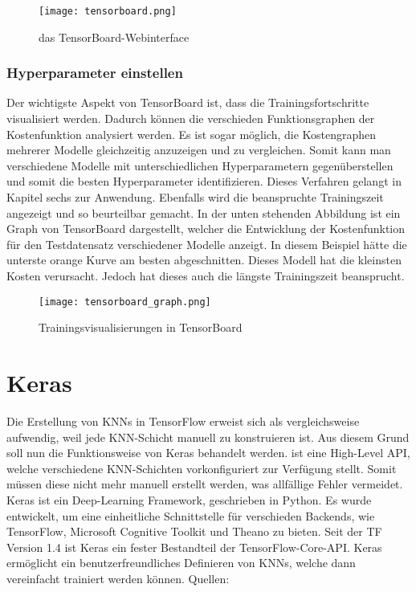 \begin{figure}[h!]
  \centering
  \texttt{[image: tensorboard.png]}
  \caption{das TensorBoard-Webinterface}
\end{figure}

\subsubsection{Hyperparameter einstellen}
Der wichtigste Aspekt von TensorBoard ist, dass die Trainingsfortschritte
visualisiert werden.
Dadurch können die verschieden Funktionsgraphen der Kostenfunktion analysiert werden.
Es ist sogar möglich, die Kostengraphen mehrerer Modelle gleichzeitig anzuzeigen und zu vergleichen.
Somit kann man verschiedene Modelle mit unterschiedlichen Hyperparametern
gegenüberstellen und somit die besten Hyperparameter identifizieren.
Dieses Verfahren gelangt in Kapitel sechs zur Anwendung.
Ebenfalls wird die beanspruchte Trainingszeit angezeigt und so beurteilbar gemacht.
\para{}
In der unten stehenden Abbildung ist ein Graph von TensorBoard dargestellt,
welcher die Entwicklung der Kostenfunktion für den Testdatensatz verschiedener
Modelle anzeigt. In diesem Beispiel hätte die unterste orange Kurve am besten
abgeschnitten. Dieses Modell hat die kleinsten Kosten verursacht. Jedoch hat
dieses auch die längste Trainingszeit beansprucht.

\begin{figure}[h!]
  \centering
  \texttt{[image: tensorboard\_graph.png]}
  \caption{Trainingsvisualisierungen in TensorBoard}
\end{figure}
\para{}

\section{Keras}
Die Erstellung von KNNs in TensorFlow erweist sich als vergleichsweise aufwendig, weil jede
KNN-Schicht manuell zu konstruieren ist.  Aus diesem Grund soll nun die
Funktionsweise von Keras behandelt werden.  ist eine High-Level
API, welche verschiedene KNN-Schichten vorkonfiguriert zur Verfügung stellt. Somit müssen diese
nicht mehr manuell erstellt werden, was allfällige Fehler vermeidet.
\para{}
Keras ist ein Deep-Learning Framework, geschrieben in
Python. Es wurde entwickelt, um eine einheitliche Schnittstelle für
verschieden Backends, wie TensorFlow, Microsoft Cognitive Toolkit und Theano zu
bieten. Seit der TF Version 1.4 ist Keras ein fester Bestandteil der TensorFlow-Core-API.
Keras ermöglicht ein benutzerfreundliches Definieren von
KNNs, welche dann vereinfacht trainiert werden können.
\para{}
Quellen: \cite{net:keras_docs} \cite{net:tf_docs}

